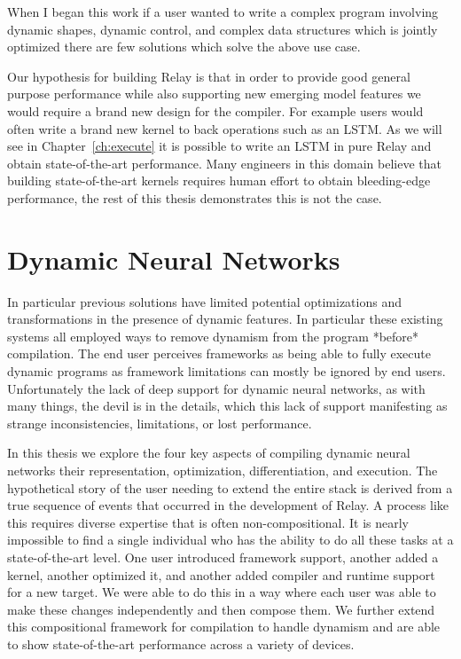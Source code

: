 When I began this work if a user wanted to write a complex program involving dynamic shapes,
  dynamic control, and complex data structures which is jointly optimized there are few
  solutions which solve the above use case.

Our hypothesis for building Relay is that in order to provide good general
  purpose performance while also supporting new emerging model features
  we would require a brand new design for the compiler.
For example users would often write a brand new kernel to back operations such
  as an LSTM.
As we will see in Chapter~\ref{ch:execute} it is possible to write an LSTM in pure Relay
  and obtain state-of-the-art performance.
Many engineers in this domain believe that building state-of-the-art kernels requires
  human effort to obtain bleeding-edge performance, the rest of this thesis demonstrates
  this is not the case.

\section{Dynamic Neural Networks}

In particular previous solutions have limited potential optimizations
  and transformations in the presence of dynamic features.
In particular these existing systems all employed ways to remove
  dynamism from the program *before* compilation.
The end user perceives frameworks as being able to
  fully execute dynamic programs as framework limitations can mostly be ignored by end
  users.
Unfortunately the lack of deep support for dynamic neural networks,
  as with many things, the devil is in the details, which this lack
  of support manifesting as strange inconsistencies, limitations, or lost performance.

In this thesis we explore the four key aspects of compiling dynamic
  neural networks their representation, optimization, differentiation,
  and execution.
The hypothetical story of the user needing to extend the entire stack is derived
  from a true sequence of events that occurred in the development of Relay.
A process like this requires diverse expertise that is often non-compositional.
It is nearly impossible to find a single individual who has the ability
  to do all these tasks at a state-of-the-art level.
One user introduced framework support, another added a kernel, another optimized it,
  and another added compiler and runtime support for a new target.
We were able to do this in a way where each user was able to make these
  changes independently and then compose them.
We further extend this compositional framework for compilation to handle dynamism
  and are able to show state-of-the-art performance across a variety of devices.

